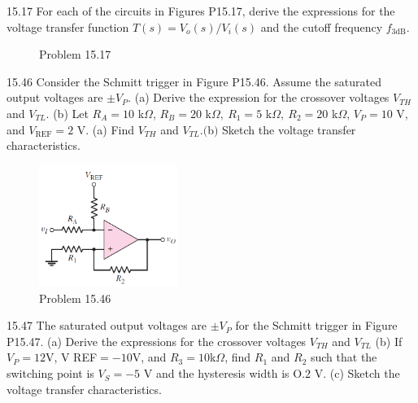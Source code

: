 \documentclass[a4paper,11pt,UTF8]{article}
\begin{document}
15.17 For each of the circuits in Figures P15.17, derive the expressions for the voltage transfer function $T(s)=V_o(s)/V_i(s)$ and the cutoff frequency $f_{3\text{dB}}.$
\begin{figure}[H]
	\centering

	\caption{Problem 15.17}
\end{figure}
15.46 Consider the Schmitt trigger in Figure P15.46. Assume the saturated output voltages are $\pm V_P.$ (a) Derive the expression for the crossover voltages $V_{TH}$ and $V_{TL}$. (b) Let $R_A=10$ k$\Omega$, $R_B=20$ k$\Omega,\:R_1=5$ k$\Omega,\:R_2=20$ k$\Omega$, $V_P=10$ V, and $V_{\mathrm{REF}}=2$ V. (a) Find $V_{TH}$ and $V_{TL}.( $b$) $ Sketch the voltage transfer characteristics.
\begin{figure}[H]
	\centering
	\includegraphics[width=0.4\textwidth]{15.46}
	\caption{Problem 15.46}
\end{figure}
15.47 The saturated output voltages are $\pm V_P$ for the Schmitt trigger in Figure P15.47. (a) Derive the expressions for the crossover voltages $V_{TH}$ and  $V_{TL}$ (b) If $V_P= 12$V, V REF$= - 10$V, and $R_3= 10$k$\Omega$, find $R_1$ and $R_2$ such that the switching point is $V_S=-5$ V and the hysteresis width is O.2 V. (c) Sketch the voltage transfer characteristics.
\end{document}
